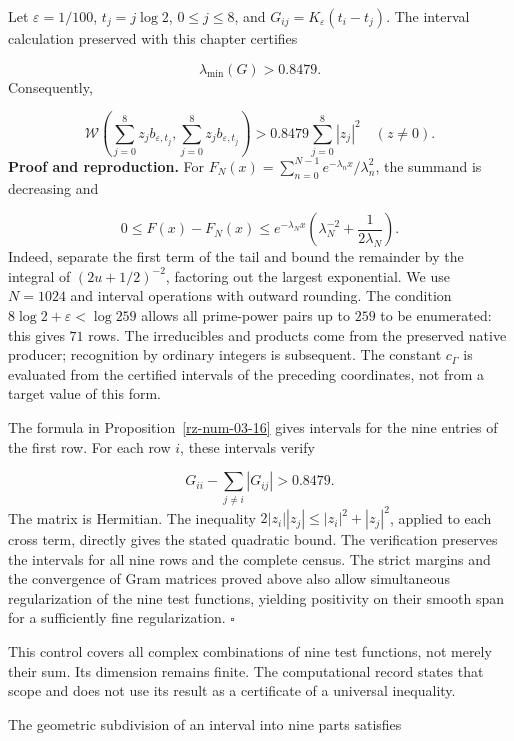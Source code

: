 Let \(\varepsilon=1/100\), \(t_j=j\log2\), \(0\leq j\leq8\), and \(G_{ij}=K_\varepsilon(t_i-t_j)\). The interval calculation preserved with this chapter certifies

\[
\lambda_{\min}(G)>0.8479.
\]
Consequently,

\[
\mathscr W\left(\sum_{j=0}^8z_jb_{\varepsilon,t_j},
\sum_{j=0}^8z_jb_{\varepsilon,t_j}\right)
>0.8479\sum_{j=0}^8|z_j|^2
\quad(z\neq0).
\]
\textbf{Proof and reproduction.} For \(F_N(x)=\sum_{n=0}^{N-1}e^{-\lambda_nx}/\lambda_n^2\), the summand is decreasing and

\[
0\leq F(x)-F_N(x)
\leq e^{-\lambda_Nx}
\left(\lambda_N^{-2}+\frac1{2\lambda_N}\right).
\]
Indeed, separate the first term of the tail and bound the remainder by the integral of \((2u+1/2)^{-2}\), factoring out the largest exponential. We use \(N=1024\) and interval operations with outward rounding. The condition \(8\log2+\varepsilon<\log259\) allows all prime-power pairs up to \(259\) to be enumerated: this gives \(71\) rows. The irreducibles and products come from the preserved native producer; recognition by ordinary integers is subsequent. The constant \(c_\Gamma\) is evaluated from the certified intervals of the preceding coordinates, not from a target value of this form.

The formula in Proposition~\ref{rz-num-03-16} gives intervals for the nine entries of the first row. For each row \(i\), these intervals verify

\[
G_{ii}-\sum_{j\neq i}|G_{ij}|>0.8479.
\]
The matrix is Hermitian. The inequality \(2|z_i||z_j|\leq|z_i|^2+|z_j|^2\), applied to each cross term, directly gives the stated quadratic bound. The verification preserves the intervals for all nine rows and the complete census. The strict margins and the convergence of Gram matrices proved above also allow simultaneous regularization of the nine test functions, yielding positivity on their smooth span for a sufficiently fine regularization. \hfill\(\square\)

This control covers all complex combinations of nine test functions, not merely their sum. Its dimension remains finite. The computational record states that scope and does not use its result as a certificate of a universal inequality.

The geometric subdivision of an interval into nine parts satisfies

